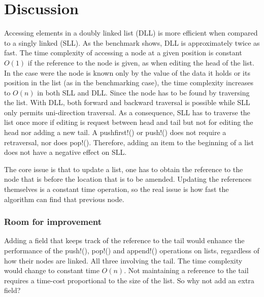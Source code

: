 \documentclass[a4paper, 11pt]{article}
\begin{document}

    \clearpage
    \section*{Discussion}

Accessing elements in a doubly linked list (DLL) is more efficient when compared to a
singly linked (SLL). As the benchmark shows, DLL is
approximately twice as fast. 
The time complexity of accessing a node at a given position 
is constant $O(1)$ if the reference to the node is given, as when editing the
head of the list. In the case were the node is known only by the value of the data it
holds or its position in the list (as in the benchmarking case), the time complexity 
increases to $O(n)$ in both SLL and DLL. Since the node has to be found by
traversing the list. With DLL, both forward and backward traversal is possible 
while SLL only permits uni-direction traversal. As a consequence, SLL has to 
traverse the list once more if editing is request between head and tail but not
for editing the head nor adding a new tail. A pushfirst!() or push!() does not
require a retraversal, nor does pop!().
Therefore, adding an item to the beginning of a list does not have a negative
effect on SLL.  

The core issue is that to update a list, one has to obtain the 
reference to the node that is before the location that is to be amended. 
Updating the references themselves is a
constant time operation, so the real issue is how fast the algorithm can 
find that previous node. 

\subsubsection*{Room for improvement}
Adding a field that keeps track of the reference to the tail would enhance the 
performance of the push!(), pop!() and append!() operations on lists, regardless of how
their nodes are linked. All three involving the tail. 
The time complexity would change to constant time
$O(n)$.  Not maintaining a reference to the tail requires a time-cost proportional to the 
size of the list. So why not add an extra field? 
\end{document}

